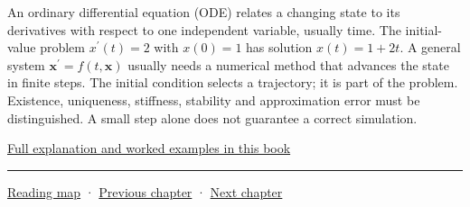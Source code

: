 \hypertarget{02-foundations-ii-ch021-immediate-footing-ordinary-differential-equation}{}

An ordinary differential equation (ODE) relates a changing state to its derivatives with respect to one independent variable, usually time. The initial-value problem \(x^{\prime}(t)=2\) with \(x(0)=1\) has solution \(x(t)=1+2t\). A general system \(\mathbf x^{\prime}=f(t,\mathbf x)\) usually needs a numerical method that advances the state in finite steps. The initial condition selects a trajectory; it is part of the problem. Existence, uniqueness, stiffness, stability and approximation error must be distinguished. A small step alone does not guarantee a correct simulation.

\hyperref[02-foundations-ii-ch025-odes-and-numerical-simulation]{Full explanation and worked examples in this book}

\begin{center}\rule{0.5\linewidth}{0.5pt}\end{center}

\hyperref[volume-reading-map]{Reading map} · \hyperref[01-foundations-i-ch020-choose-matrix-factorizations-from-structure]{Previous chapter} · \hyperref[02-foundations-ii-ch022-accumulation-quadrature-and-the-bridge-to-probability]{Next chapter}
